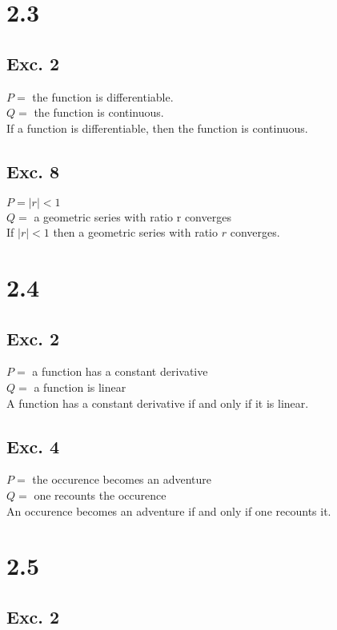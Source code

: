 \documentclass[12pt]{article}
\begin{document}
\section*{2.3}

\subsection*{Exc. 2}
$P = $ the function is differentiable. \\
$Q = $ the function is continuous. \\
If a function is differentiable, then the function is continuous.

\subsection*{Exc. 8}
$P = |r| < 1$ \\ 
$Q = $ a geometric series with ratio r converges \\
If $ |r| < 1$ then a geometric series with ratio $r$ converges.

\section*{2.4}

\subsection*{Exc. 2}
$P = $ a function has a constant derivative \\
$Q = $ a function is linear \\ 
A function has a constant derivative if and only if it is linear.

\subsection*{Exc. 4}
$P = $ the occurence becomes an adventure \\ 
$Q = $ one recounts the occurence \\ 
An occurence becomes an adventure if and only if one recounts it. 

\section*{2.5}

\subsection*{Exc. 2}
\end{document}
